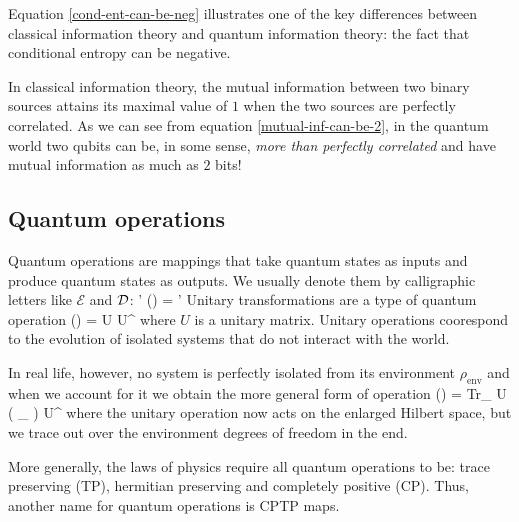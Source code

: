 \documentclass[aps,11pt,twoside,letterpaper]{article}
\def\Tr{\textup{Tr}}
\def\E{\mathcal{E}}
\begin{document}
			Equation \eqref{cond-ent-can-be-neg} illustrates one of the key differences between classical information
			theory and quantum information theory: the fact that conditional entropy can be negative.
			
			In classical information theory, the mutual information between two binary sources attains its maximal value
			of $1$ when the two sources are perfectly correlated. As we can see from equation 
			\eqref{mutual-inf-can-be-2}, in the quantum world two qubits can be, in some sense,
			\emph{more than perfectly correlated} and have mutual information as much as $2$ bits!
			

		\subsection{Quantum operations}	

			Quantum operations are mappings that take quantum states as inputs and produce quantum
			states as outputs. We usually denote them by calligraphic letters like $\E$ and ${\cal D}$:
			\be
				\rho \stackrel{\E}{\longrightarrow} \rho' 	\qquad \E(\rho) = \rho'
			\ee
			Unitary transformations are a type of quantum operation
			\be
				\E(\rho) = U \rho U^{\dag}
			\ee
			where $U$ is a unitary matrix. Unitary operations coorespond to the evolution of isolated
            systems that do not interact with the world.

			In real life, however, no system is perfectly isolated from its environment $\rho_{\text{env}}$ 
			and when we account for it we obtain the more general form of operation 
			\be
				\E(\rho) = \Tr_{} U \left( \rho \otimes \rho_{} \right) U^{\dag}
			\ee
			where the unitary operation now acts on the enlarged Hilbert space, but we trace out over the
			environment degrees of freedom in the end. 

			More generally, the laws of physics require all quantum operations to be:
			trace preserving (TP), hermitian preserving and completely positive (CP).
			Thus, another name for quantum operations is CPTP maps.
									
\end{document}
